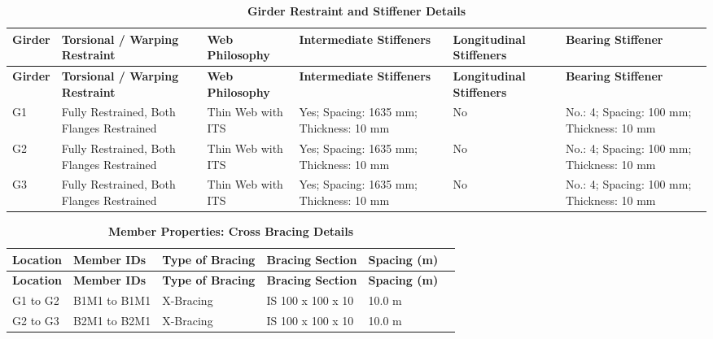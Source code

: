 \documentclass[12pt,a4paper]{report}
\numberwithin{table}{chapter}
\numberwithin{figure}{chapter}
\begin{document}
\vspace{4pt}
\begin{longtable}{|L{1.4cm}|p{2.2cm}|p{2.2cm}|p{3.0cm}|p{2.4cm}|p{2.2cm}|}
\caption{\textbf{Girder Restraint and Stiffener Details}}\\
\hline
\textbf{Girder} & \textbf{Torsional / Warping Restraint} & \textbf{Web Philosophy} & \textbf{Intermediate Stiffeners} & \textbf{Longitudinal Stiffeners} & \textbf{Bearing Stiffener} \\[6pt]
\hline
\endfirsthead

\hline
\textbf{Girder} & \textbf{Torsional / Warping Restraint} & \textbf{Web Philosophy} & \textbf{Intermediate Stiffeners} & \textbf{Longitudinal Stiffeners} & \textbf{Bearing Stiffener} \\[6pt]
\hline
\endhead

G1 & Fully Restrained, Both Flanges Restrained & Thin Web with ITS & Yes; Spacing: 1635 mm; Thickness: 10 mm & No & No.: 4; Spacing: 100 mm; Thickness: 10 mm \\[8pt]
\hline
G2 & Fully Restrained, Both Flanges Restrained & Thin Web with ITS & Yes; Spacing: 1635 mm; Thickness: 10 mm & No & No.: 4; Spacing: 100 mm; Thickness: 10 mm \\[8pt]
\hline
G3 & Fully Restrained, Both Flanges Restrained & Thin Web with ITS & Yes; Spacing: 1635 mm; Thickness: 10 mm & No & No.: 4; Spacing: 100 mm; Thickness: 10 mm \\[8pt]
\hline
\end{longtable}



\newpage

\vspace{0.4em}
\setlength{\tabcolsep}{4pt}
\setlength\LTleft{0pt}
\setlength\LTright{\fill}

\begin{longtable}{|L{2.2cm}|L{2.2cm}|L{3.0cm}|L{2.5cm}|C{1.8cm}|C{1.8cm}|}
\caption{\textbf{Member Properties: Cross Bracing Details}}
\hline
\textbf{Location} & \textbf{Member IDs} & \textbf{Type of Bracing} & \textbf{Bracing Section} & \textbf{Spacing (m)} \\
\hline
\endfirsthead

\hline
\textbf{Location} & \textbf{Member IDs} & \textbf{Type of Bracing} & \textbf{Bracing Section} & \textbf{Spacing (m)} \\
\hline
\endhead
G1 to G2 & B1M1 to B1M1 & X-Bracing & IS 100 x 100 x 10 & 10.0 m \\[6pt]
\hline
G2 to G3 & B2M1 to B2M1 & X-Bracing & IS 100 x 100 x 10 & 10.0 m \\[6pt]
\hline
\end{longtable}
\end{document}
